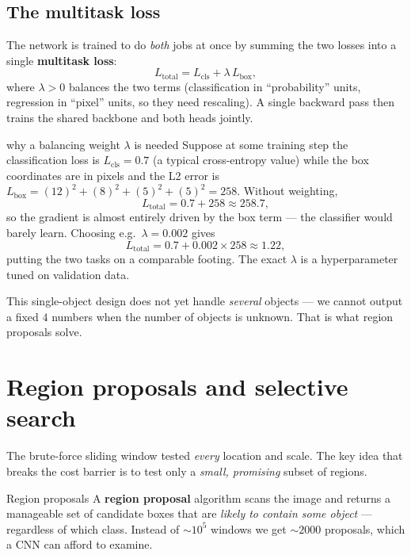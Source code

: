 \documentclass{report}
\begin{document}
\subsection{The multitask loss}

The network is trained to do \emph{both} jobs at once by summing the two
losses into a single \textbf{multitask loss}:
\[
L_{\text{total}} = L_{\text{cls}} + \lambda\, L_{\text{box}},
\]
where $\lambda > 0$ balances the two terms (classification in
``probability'' units, regression in ``pixel'' units, so they need
rescaling). A single backward pass then trains the shared backbone and both
heads jointly.

\begin{exbox}{why a balancing weight $\lambda$ is needed}
Suppose at some training step the classification loss is $L_{\text{cls}}=0.7$
(a typical cross-entropy value) while the box coordinates are in pixels and the
L2 error is $L_{\text{box}} = (12)^2 + (8)^2 + (5)^2 + (5)^2 = 258$. Without
weighting,
\[
L_{\text{total}} = 0.7 + 258 \approx 258.7,
\]
so the gradient is almost entirely driven by the box term --- the classifier
would barely learn. Choosing e.g.\ $\lambda = 0.002$ gives
\[
L_{\text{total}} = 0.7 + 0.002\times 258 \approx 1.22,
\]
putting the two tasks on a comparable footing. The exact $\lambda$ is a
hyperparameter tuned on validation data.
\end{exbox}

This single-object design does not yet handle \emph{several} objects --- we
cannot output a fixed $4$ numbers when the number of objects is unknown. That
is what region proposals solve.

\section{Region proposals and selective search}

The brute-force sliding window tested \emph{every} location and scale. The key
idea that breaks the cost barrier is to test only a \emph{small, promising}
subset of regions.

\begin{defbox}{Region proposals}
A \textbf{region proposal} algorithm scans the image and returns a manageable
set of candidate boxes that are \emph{likely to contain some object} --- regardless
of which class. Instead of $\sim\!10^5$ windows we get $\sim\!2000$ proposals,
which a CNN can afford to examine.
\end{defbox}
\end{document}
